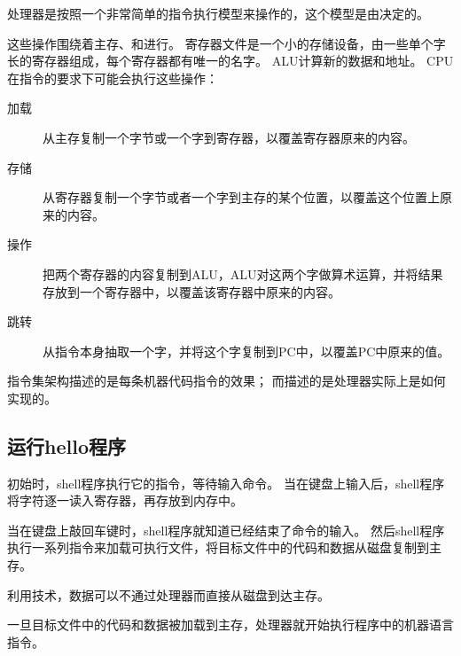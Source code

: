 {{{            处理器是按照一个非常简单的指令执行模型来操作的，这个模型是由决定的。

            这些操作围绕着主存、和进行。
            寄存器文件是一个小的存储设备，由一些单个字长的寄存器组成，每个寄存器都有唯一的名字。
            ALU计算新的数据和地址。
            CPU在指令的要求下可能会执行这些操作：

            \begin{description}
                \item[加载] 从主存复制一个字节或一个字到寄存器，以覆盖寄存器原来的内容。
                \item[存储] 从寄存器复制一个字节或者一个字到主存的某个位置，以覆盖这个位置上原来的内容。
                \item[操作] 把两个寄存器的内容复制到ALU，ALU对这两个字做算术运算，并将结果存放到一个寄存器中，以覆盖该寄存器中原来的内容。
                \item[跳转] 从指令本身抽取一个字，并将这个字复制到PC中，以覆盖PC中原来的值。
            \end{description}

            指令集架构描述的是每条机器代码指令的效果；
            而描述的是处理器实际上是如何实现的。
        }
    }

    \subsection{运行hello程序}
    {
        初始时，shell程序执行它的指令，等待输入命令。
        当在键盘上输入后，shell程序将字符逐一读入寄存器，再存放到内存中。

        当在键盘上敲回车键时，shell程序就知道已经结束了命令的输入。
        然后shell程序执行一系列指令来加载可执行文件，将目标文件中的代码和数据从磁盘复制到主存。

        利用技术，数据可以不通过处理器而直接从磁盘到达主存。

        一旦目标文件中的代码和数据被加载到主存，处理器就开始执行程序中的机器语言指令。
    }
}
